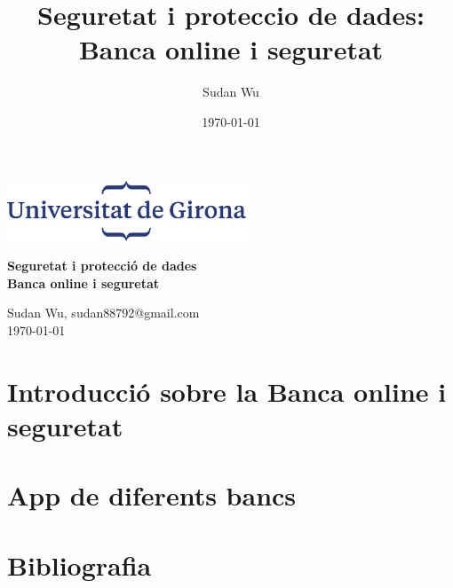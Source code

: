 \documentclass[12pt,a4paper]{article}
\title{Seguretat i proteccio de dades: Banca online i seguretat}
\author{Sudan Wu}
\date{\today}
\begin{document}
\begin{titlepage}
    \begin{center}
        \includegraphics[height=1.8cm]{logoUdG}\\\vfill
    \end{center}
    \center
    {\huge \bfseries Seguretat i protecció de dades}\\[0.5cm]
    {\Huge \bfseries Banca online i seguretat} \\
    \vfill
    \begin{center} \large
        {Sudan Wu, sudan88792@gmail.com} \\[0.25cm]
        {\today}\\ [1cm]
    \end{center}

\end{titlepage}

\tableofcontents

\clearpage
\section{Introducció sobre la Banca online i seguretat}

\clearpage

\clearpage

\clearpage

\clearpage
\section{App de diferents bancs}


\clearpage
\section{Bibliografia}

\end{document}
